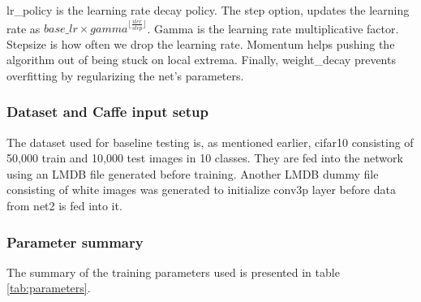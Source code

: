 \documentclass[a4paper, 12pt]{article}
\numberwithin{equation}{section}
\begin{document}
	lr\_policy is the learning rate decay policy. The step option, updates the learning rate as $base\_lr \times gamma ^ {\lfloor \frac{iter}{step} \rfloor}$. Gamma is the learning rate multiplicative factor. Stepsize is how often we drop the learning rate. Momentum helps pushing the algorithm out of being stuck on local extrema. Finally, weight\_decay prevents overfitting by regularizing the net's parameters.
	

	\subsubsection{Dataset and Caffe input setup}
	
	The dataset used for baseline testing is, as mentioned earlier, cifar10 consisting of 50,000 train and 10,000 test images in 10 classes. They are fed into the network using an LMDB file generated before training. Another LMDB dummy file consisting of white images was generated to initialize conv3p layer before data from net2 is fed into it.
	
	\subsubsection{Parameter summary}
	
	The summary of the training parameters used is presented in table \ref{tab:parameters}.
	
\end{document}
